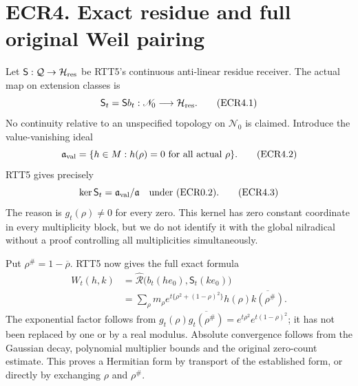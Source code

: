 \section{ECR4. Exact residue and full original Weil
pairing}\label{ecr4.-exact-residue-and-full-original-weil-pairing}

Let \(\mathsf S:\mathcal Q\to\mathcal H_{\rm res}\) be RTT5's continuous
anti-linear residue receiver. The actual map on extension classes is \[
\mathsf S_t=\mathsf S b_t:\mathscr N_0\longrightarrow\mathcal H_{\rm res}.
\tag{ECR4.1}
\] No continuity relative to an unspecified topology on \(\mathscr N_0\)
is claimed. Introduce the value-vanishing ideal \[
\mathfrak a_{\rm val}=\{h\in M:h(\rho)=0\text{ for all actual }\rho\}.
\tag{ECR4.2}
\] RTT5 gives precisely \[
\ker\mathsf S_t=\mathfrak a_{\rm val}/\mathfrak a
\quad\text{under (ECR0.2)}.
\tag{ECR4.3}
\] The reason is \(g_t(\rho)\ne0\) for every zero. This kernel has zero
constant coordinate in every multiplicity block, but we do not identify
it with the global nilradical without a proof controlling all
multiplicities simultaneously.

Put \(\rho^\#=1-\overline\rho\). RTT5 now gives the full exact formula
\[
\begin{aligned}
W_t(h,k)
&=\widehat{\mathcal R}\bigl(b_t(h e_0),\mathsf S_t(k e_0)\bigr)\\
&=\sum_\rho m_\rho
e^{t\{\rho^2+(1-\rho)^2\}}
h(\rho)\overline{k(\rho^\#)}.
\end{aligned}
\tag{ECR4.4}
\] The exponential factor follows from
\(g_t(\rho)\overline{g_t(\rho^\#)}=e^{t\rho^2}e^{t(1-\rho)^2}\); it has
not been replaced by one or by a real modulus. Absolute convergence
follows from the Gaussian decay, polynomial multiplier bounds and the
original zero-count estimate. This proves a Hermitian form by transport
of the established form, or directly by exchanging \(\rho\) and
\(\rho^\#\).

